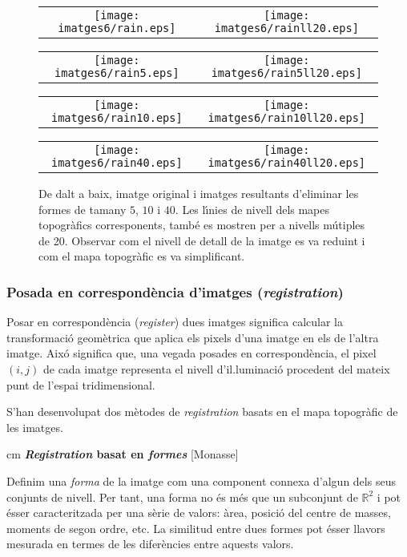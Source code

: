 \documentclass{article}
\def\R{\mathbb R}
\begin{document}
\begin{figure}[htbp]
\begin{center}
\begin{tabular}{cc}
\texttt{[image: imatges6/rain.eps]} &
\texttt{[image: imatges6/rainll20.eps]}
\end{tabular}
\begin{tabular}{cc}
\texttt{[image: imatges6/rain5.eps]} &
\texttt{[image: imatges6/rain5ll20.eps]}
\end{tabular}
\begin{tabular}{cc}
\texttt{[image: imatges6/rain10.eps]} &
\texttt{[image: imatges6/rain10ll20.eps]}
\end{tabular}
\begin{tabular}{cc}
\texttt{[image: imatges6/rain40.eps]} &
\texttt{[image: imatges6/rain40ll20.eps]}
\end{tabular}
\end{center}
\caption{De dalt a baix, imatge original i imatges resultants d'eliminar les formes de
tamany $5$, $10$ i $40$. Les l\'\i nies de nivell dels mapes topogr\`afics corresponents, 
tamb\'e es mostren per a nivells m\'utiples de 20.
Observar com el nivell de detall de la imatge es va reduint i com el mapa topogr\`afic es va simplificant.}
\label{ex_grain}
\end{figure}

\newpage
\subsubsection{Posada en correspond\`encia d'imatges ({\it registration})}

Posar en correspond\`encia ({\it register}) dues imatges significa calcular la transformaci\'o geom\`etrica que 
aplica  els pixels d'una imatge en els de l'altra imatge. Aix\'o significa que, una vegada posades en correspond\`encia, 
el pixel $(i, j)$ de cada imatge representa el nivell d'il.luminaci\'o procedent del mateix punt de l'espai 
tridimensional.

S'han desenvolupat dos m\`etodes de {\it registration} basats en el mapa topogr\`afic de les imatges.

 cm
\noindent
{\bf {\it Registration} basat en {\it formes}} [Monasse]

Definim una {\it forma} de la imatge com una component connexa d'algun dels seus conjunts de nivell.
Per tant, una forma no \'es m\'es que un subconjunt de $\R^2$ i pot \'esser caracteritzada per una
s\`erie de valors: \`area, posici\'o del centre de masses, moments de segon ordre, etc. La similitud
entre dues formes pot \'esser llavors mesurada en termes de les difer\`encies entre aquests valors.
\end{document}
